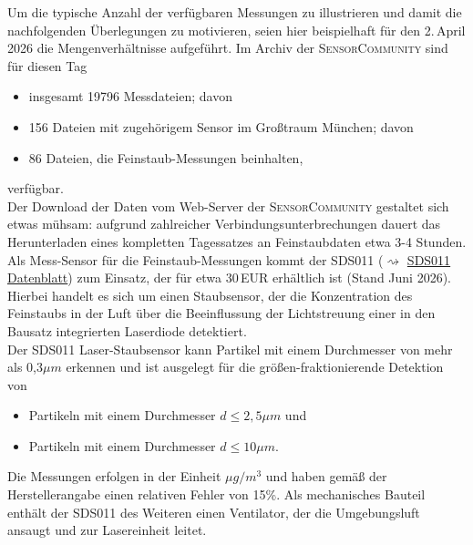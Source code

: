 Um die typische Anzahl der verfügbaren Messungen zu illustrieren und damit 
die nachfolgenden Überlegungen zu motivieren, seien
hier beispielhaft für den 2.\,April 2026 die Mengenverhältnisse aufgeführt. 
Im Archiv der \textsc{SensorCommunity} sind für diesen Tag 
\begin{itemize}[topsep=2pt,parsep=1pt,itemsep=0.5pt]
\item[$\circ$] insgesamt 19796 Messdateien; davon
\item[$\circ$] 156 Dateien mit zugehörigem Sensor im Großtraum München; davon
\item[$\circ$] 86 Dateien, die Feinstaub-Messungen beinhalten,  
\end{itemize}
verfügbar.\\
Der Download der Daten vom Web-Server der \textsc{SensorCommunity} 
gestaltet sich etwas mühsam: aufgrund zahlreicher 
Verbindungsunterbrechungen dauert das Herunterladen eines 
kompletten Tagessatzes an Feinstaubdaten etwa 3-4 Stunden. \\

Als Mess-Sensor für die Feinstaub-Messungen kommt der SDS011 
($\rightsquigarrow$ \href{https://cdn-reichelt.de/documents/datenblatt/X200/SDS011-DATASHEET.pdf}{SDS011 Datenblatt})
zum Einsatz, der für etwa 30\,EUR erhältlich ist (Stand Juni 2026). 
Hierbei handelt es sich um einen Staubsensor, der die Konzentration des
Feinstaubs in der Luft über die Beeinflussung der Lichtstreuung einer
in den Bausatz integrierten Laserdiode detektiert.\\
Der SDS011 Laser-Staubsensor 
kann Partikel mit einem Durchmesser von mehr als 0,3$\mu m$ erkennen und 
ist ausgelegt für die größen-fraktionierende Detektion von 
\begin{itemize}[topsep=2pt,parsep=1pt,itemsep=0.5pt]
\item[$\circ$] Partikeln mit einem Durchmesser $d \leq 2,5\mu m$ und 
\item[$\circ$] Partikeln mit einem Durchmesser $d \leq 10\mu m$.
\end{itemize}
Die Messungen erfolgen in der Einheit $\mu g/m^3$ und haben gemäß
der Herstellerangabe einen relativen Fehler von 15\%. Als mechanisches Bauteil enthält der SDS011 des Weiteren einen Ventilator, der die
Umgebungsluft ansaugt und zur Lasereinheit leitet. \\

